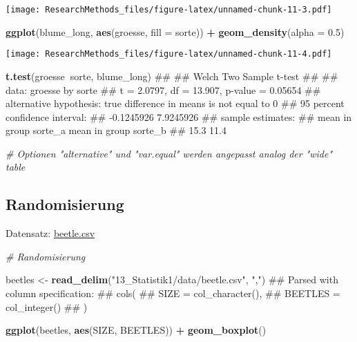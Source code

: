 \documentclass[]{book}
\newenvironment{Shaded}{\begin{snugshade}}{\end{snugshade}}
\newcommand{\KeywordTok}[1]{\textcolor[rgb]{0.13,0.29,0.53}{\textbf{#1}}}
\newcommand{\DataTypeTok}[1]{\textcolor[rgb]{0.13,0.29,0.53}{#1}}
\newcommand{\FloatTok}[1]{\textcolor[rgb]{0.00,0.00,0.81}{#1}}
\newcommand{\StringTok}[1]{\textcolor[rgb]{0.31,0.60,0.02}{#1}}
\newcommand{\CommentTok}[1]{\textcolor[rgb]{0.56,0.35,0.01}{\textit{#1}}}
\newcommand{\OperatorTok}[1]{\textcolor[rgb]{0.81,0.36,0.00}{\textbf{#1}}}
\newcommand{\NormalTok}[1]{#1}
\begin{document}
\texttt{[image: ResearchMethods\_files/figure-latex/unnamed-chunk-11-3.pdf]}

\begin{Shaded}
\begin{Highlighting}[]

\KeywordTok{ggplot}\NormalTok{(blume_long, }\KeywordTok{aes}\NormalTok{(groesse, }\DataTypeTok{fill =}\NormalTok{ sorte)) }\OperatorTok{+}
\StringTok{  }\KeywordTok{geom_density}\NormalTok{(}\DataTypeTok{alpha =} \FloatTok{0.5}\NormalTok{)}
\end{Highlighting}
\end{Shaded}

\texttt{[image: ResearchMethods\_files/figure-latex/unnamed-chunk-11-4.pdf]}

\begin{Shaded}
\begin{Highlighting}[]




\KeywordTok{t.test}\NormalTok{(groesse}\OperatorTok{~}\NormalTok{sorte, blume_long)}
\NormalTok{## }
\NormalTok{##  Welch Two Sample t-test}
\NormalTok{## }
\NormalTok{## data:  groesse by sorte}
\NormalTok{## t = 2.0797, df = 13.907, p-value = 0.05654}
\NormalTok{## alternative hypothesis: true difference in means is not equal to 0}
\NormalTok{## 95 percent confidence interval:}
\NormalTok{##  -0.1245926  7.9245926}
\NormalTok{## sample estimates:}
\NormalTok{## mean in group sorte_a mean in group sorte_b }
\NormalTok{##                  15.3                  11.4}

\CommentTok{# Optionen "alternative" und "var.equal" werden angepasst analog der "wide" table}
\end{Highlighting}
\end{Shaded}

\subsection{Randomisierung}\label{randomisierung}

Datensatz: \href{13_Statistik1/data/beetle.csv}{beetle.csv}

\begin{Shaded}
\begin{Highlighting}[]
\CommentTok{# Randomisierung}

\NormalTok{beetles <-}\StringTok{ }\KeywordTok{read_delim}\NormalTok{(}\StringTok{"13_Statistik1/data/beetle.csv"}\NormalTok{, }\StringTok{","}\NormalTok{)}
\NormalTok{## Parsed with column specification:}
\NormalTok{## cols(}
\NormalTok{##   SIZE = col_character(),}
\NormalTok{##   BEETLES = col_integer()}
\NormalTok{## )}


\KeywordTok{ggplot}\NormalTok{(beetles, }\KeywordTok{aes}\NormalTok{(SIZE, BEETLES)) }\OperatorTok{+}
\StringTok{  }\KeywordTok{geom_boxplot}\NormalTok{()}
\end{Highlighting}
\end{Shaded}
\end{document}
